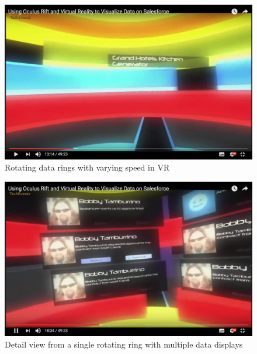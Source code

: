 \begin{figure}[h]
	\begin{center}
		\includegraphics[width=14cm]{03_Figures/05_LitReview/CodeScience2015.png}
		\caption[Rotating data rings with varying speed in VR]{Rotating data rings with varying speed in VR \citep{CodeScience2015}}
		\label{fig:rotatingrings}
	\end{center}
\end{figure}


\begin{figure}[h]
	\begin{center}
		\includegraphics[width=14cm]{03_Figures/05_LitReview/CodeScience2015a.png}
		\caption[Detail view from a single rotating ring with multiple data displays]{Detail view from a single rotating ring with multiple data displays \citep{CodeScience2015}}
		\label{fig:rotatingringsdetail}
	\end{center}
\end{figure}


